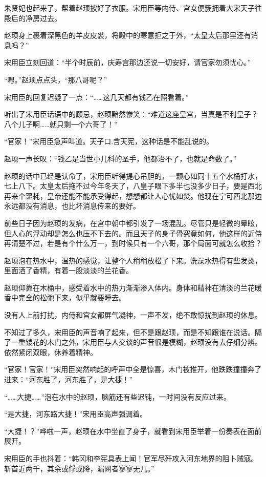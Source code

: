 朱贤妃也起来了，帮着赵顼披好了衣服。宋用臣等内侍、宫女便簇拥着大宋天子往殿后的净房过去。

赵顼身上裹着深黑色的羊皮皮裘，将殿中的寒意拒之于外，“太皇太后那里还有消息吗？”

宋用臣立刻回道：“半个时辰前，庆寿宫那边还说一切安好，请官家勿须忧心。”

“嗯。”赵顼点点头，“那八哥呢？”

宋用臣的回复迟疑了一点：“……这几天都有钱乙在照看着。”

听出了宋用臣话语中的顾忌，赵顼黯然惨笑：“难道这座皇宫，当真是不利皇子？八个儿子啊……就只剩一个六哥了！”

“官家！”宋用臣急声叫道。天子口.含天宪，这种话是不能乱说的。

赵顼一声长叹：“钱乙是当世小儿科的圣手，他都治不了，也就是命数了。”

赵顼的话中已经是认命了，宋用臣听得提心吊胆的，一颗心如同十五个水桶打水，七上八下。太皇太后拖不过今年冬天了，八皇子眼下多半也没多少日子，要是西北再来个噩耗，皇帝还能不能承受得起，想想都让人心忧如焚。他现在宁可西北那边永远都没有消息，也比坏消息传来的要好。

前些日子因为赵顼的发病，在宫中朝中都引发了一场混乱。尽管只是轻微的晕眩，但人心的浮动却是怎么也压不下去的。而且天子的身子骨究竟如何，他这样的近侍再清楚不过，若是有个什么万一，到时候只有一个六哥，那个局面可就怎么收拾？

赵顼泡在热水中，温热的感觉，让整个人稍稍放松了下来。洗澡水热得有些发烫，里面洒了香精，有着一股淡淡的兰花香。

赵顼仰靠在木桶中，感受着水中的热力渐渐渗入体内。身体和精神在清淡的兰花暖香中完全的松弛下来，似乎就要睡去。

没有人上前打扰，内侍和宫女都屏气凝神，一声不发，绝不敢惊扰到赵顼的休息。

不知过了多久，宋用臣的声音响了起来，但不是跟赵顼，而是不知跟谁在说话。隔了一重镂花的木门之外，宋用臣与人交谈的声音很是模糊，赵顼没有去仔细分辨。依然紧闭双眼，休养着精神。

“官家！官家！”宋用臣突然响起的呼声中全是惊喜，木门被推开，他跌跌撞撞奔了进来：“河东胜了，河东胜了，是大捷！”

“……大捷……”泡在水中的赵顼，脑筋还有些迟钝，一时间没有反应过来。

“是大捷，河东路大捷！”宋用臣高声强调着。

“大捷！？”哗啦一声，赵顼在水中坐直了身子，就看到宋用臣举着一份奏表在面前展开。

宋用臣的手也抖着：“韩冈和李宪具表上闻！官军尽歼攻入河东地界的阻卜贼寇。斩首近两千，其余或俘或降，漏网者寥寥无几。”

